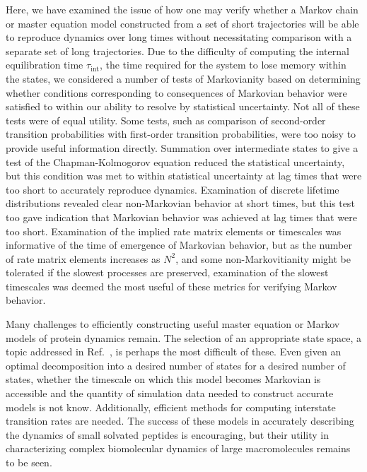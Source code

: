 Here, we have examined the issue of how one may verify whether a Markov chain or master equation model constructed from a set of short trajectories will be able to reproduce dynamics over long times without necessitating comparison with a separate set of long trajectories.
Due to the difficulty of computing the internal equilibration time $\tau_{\mathrm{int}}$, the time required for the system to lose memory within the states, we considered a number of tests of Markovianity based on determining whether conditions corresponding to consequences of Markovian behavior were satisfied to within our ability to resolve by statistical uncertainty.
Not all of these tests were of equal utility.
Some tests, such as comparison of second-order transition probabilities with first-order transition probabilities, were too noisy to provide useful information directly.
Summation over intermediate states to give a test of the Chapman-Kolmogorov equation reduced the statistical uncertainty, but this condition was met to within statistical uncertainty at lag times that were too short to accurately reproduce dynamics.
Examination of discrete lifetime distributions revealed clear non-Markovian behavior at short times, but this test too gave indication that Markovian behavior was achieved at lag times that were too short.
Examination of the implied rate matrix elements or timescales was informative of the time of emergence of Markovian behavior, but as the number of rate matrix elements increases as $N^2$, and some non-Markovitianity might be tolerated if the slowest processes are preserved, examination of the slowest timescales was deemed the most useful of these metrics for verifying Markov behavior.

Many challenges to efficiently constructing useful master equation or Markov models of protein dynamics remain.
The selection of an appropriate state space, a topic addressed in Ref.\ \cite{chodera:jcp:2006}, is perhaps the most difficult of these.
Even given an optimal decomposition into a desired number of states for a desired number of states, whether the timescale on which this model becomes Markovian is accessible and the quantity of simulation data needed to construct accurate models is not know.
Additionally, efficient methods for computing interstate transition rates are needed.
The success of these models in accurately describing the dynamics of small solvated peptides is encouraging, but their utility in characterizing complex biomolecular dynamics of large macromolecules remains to be seen.

